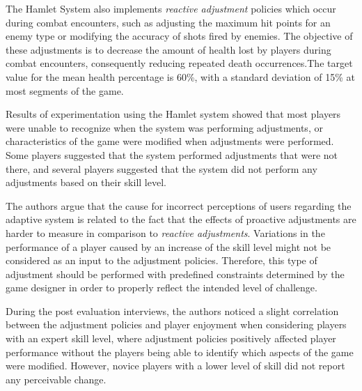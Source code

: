 The Hamlet System also implements \emph{reactive adjustment} policies which occur during combat encounters, such as adjusting the maximum hit points for an enemy type or modifying the accuracy of shots fired by enemies. The objective of these adjustments is to decrease the amount of health lost by players during combat encounters, consequently reducing repeated death occurrences.The target value for the mean health percentage is 60\%, with a standard deviation of 15\% at most segments of the game.


Results of experimentation using the Hamlet system showed that most players were unable to recognize when the system was performing adjustments, or characteristics of the game were modified when adjustments were performed. Some players suggested that the system performed adjustments that were not there, and several players suggested that the system did not perform any adjustments based on their skill level.

The authors argue that the cause for incorrect perceptions of users regarding the adaptive system is related to the fact that the effects of proactive adjustments are harder to measure in comparison to \emph{reactive adjustments}. Variations in the performance of a player caused by an increase of the skill level might not be considered as an input to the adjustment policies. Therefore, this type of adjustment should be performed with predefined constraints determined by the game designer in order to properly reflect the intended level of challenge.

During the post evaluation interviews, the authors noticed a slight correlation between the adjustment policies and player enjoyment when considering players with an expert skill level, where adjustment policies positively affected player performance without the players being able to identify which aspects of the game were modified. However, novice players with a lower level of skill did not report any perceivable change.

